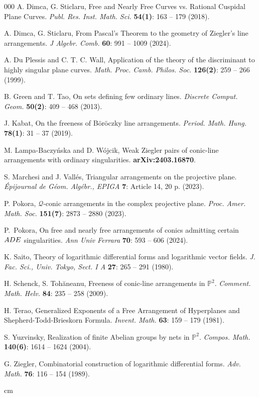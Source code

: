 \documentclass[12pt]{article}
\theoremstyle{plain}
\theoremstyle{definition}
\begin{document}
\begin{thebibliography}{000}
A. Dimca, G. Sticlaru, Free and Nearly Free Curves vs. Rational Cuspidal Plane Curves. \textit{Publ. Res. Inst. Math. Sci.} \textbf{54(1)}: 163 -- 179 (2018). 

A. Dimca, G. Sticlaru, From Pascal's Theorem to the geometry of Ziegler's line arrangements. \textit{J Algebr. Comb.} \textbf{60}: 991 -- 1009 (2024).

A. Du Plessis and C. T. C. Wall, Application of the theory of the discriminant to highly singular plane curves. \textit{Math. Proc. Camb. Philos. Soc.} \textbf{126(2)}: 259 -- 266 (1999).

B. Green and T. Tao, On sets defining few ordinary lines. \textit{Discrete Comput. Geom.} \textbf{50(2)}: 409 -- 468 (2013).

J. Kabat, On the freeness of B\"or\"oczky line arrangements. \textit{Period. Math. Hung.} \textbf{78(1)}: 31 -- 37 (2019).

M. Lampa-Baczy\'nska and D. W\'ojcik, Weak Ziegler pairs of conic-line arrangements with ordinary singularities. \textbf{arXiv:2403.16870}.

S. Marchesi and J. Vall\'es, Triangular arrangements on the projective plane. \textit{\'Epijournal de G\'eom. Alg\'ebr., EPIGA} \textbf{7}: Article 14, 20 p. (2023).

P. Pokora, $\mathcal{Q}$-conic arrangements in the complex projective plane. \textit{Proc. Amer. Math. Soc.} \textbf{151(7)}: 2873 -- 2880 (2023).

 P.~Pokora, On free and nearly free arrangements of conics admitting certain ${\rm ADE}$ singularities. \textit{Ann Univ Ferrara} \textbf{70}: 593 -- 606 (2024).

K. Saito, Theory of logarithmic differential forms and logarithmic vector fields.
\textit{J. Fac. Sci., Univ. Tokyo, Sect. I A} \textbf{27}: 265 -- 291 (1980).

 H. Schenck, S. Toh\u aneanu, Freeness of conic-line arrangements in $\mathbb{P}^2$. \textit{Comment. Math. Helv.} \textbf{84}: 235 -- 258 (2009).

H. Terao, Generalized Exponents of a Free Arrangement of Hyperplanes and Shepherd-Todd-Brieskorn Formula. \textit{Invent. Math.} \textbf{63}: 159 -- 179 (1981).

S. Yuzvinsky, Realization of finite Abelian groups by nets in $\mathbb{P}^{2}$. \textit{Compos. Math.} \textbf{140(6)}: 1614 -- 1624 (2004).

G. Ziegler, Combinatorial construction of logarithmic differential forms. \textit{Adv. Math.} \textbf{76}: 116 -- 154 (1989).
\end{thebibliography}
 cm
\end{document}
